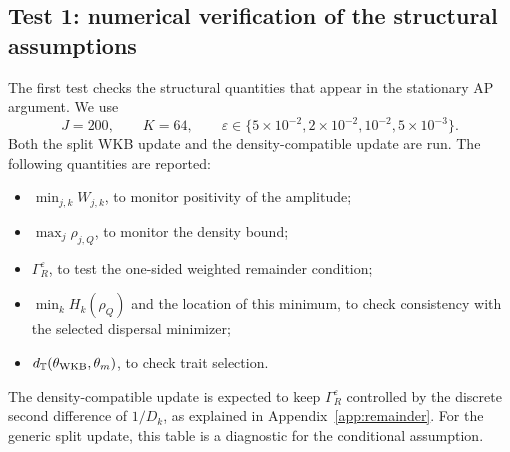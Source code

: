 \documentclass[11pt]{article}
\begin{document}
\subsection{Test 1: numerical verification of the structural assumptions}\label{subsec:test_assumptions_new}

The first test checks the structural quantities that appear in the stationary AP argument.  We use
\[
    J=200,
    \qquad
    K=64,
    \qquad
    \varepsilon\in\{5\times10^{-2},2\times10^{-2},10^{-2},5\times10^{-3}\}.
\]
Both the split WKB update and the density-compatible update are run.  The following quantities are reported:
\begin{itemize}
\item \(\min_{j,k} W_{j,k}\), to monitor positivity of the amplitude;
\item \(\max_j\rho_{j,Q}\), to monitor the density bound;
\item \(\Gamma_R^\varepsilon\), to test the one-sided weighted remainder condition;
\item \(\min_k H_k(\rho_Q)\) and the location of this minimum, to check consistency with the selected dispersal minimizer;
\item \(d_{\mathbb T}(\theta_{\rm WKB},\theta_m)\), to check trait selection.
\end{itemize}
The density-compatible update is expected to keep \(\Gamma_R^\varepsilon\) controlled by the discrete second difference of \(1/D_k\), as explained in Appendix~\ref{app:remainder}.  For the generic split update, this table is a diagnostic for the conditional assumption.
\end{document}
